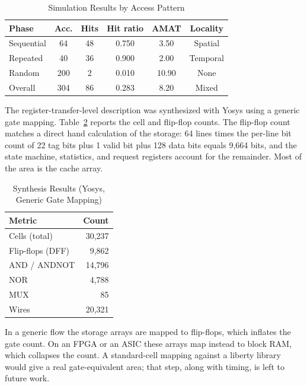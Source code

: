 \documentclass[conference]{IEEEtran}
\begin{document}
\begin{table}[t]
\caption{Simulation Results by Access Pattern}
\label{tab:results}
\centering
\begin{tabular}{@{}lccccc@{}}
\toprule
\textbf{Phase} & \textbf{Acc.} & \textbf{Hits} & \textbf{Hit ratio} & \textbf{AMAT} & \textbf{Locality} \\
\midrule
Sequential & 64  & 48 & 0.750 & 3.50  & Spatial \\
Repeated   & 40  & 36 & 0.900 & 2.00  & Temporal \\
Random     & 200 & 2  & 0.010 & 10.90 & None \\
Overall    & 304 & 86 & 0.283 & 8.20  & Mixed \\
\bottomrule
\end{tabular}
\end{table}

The register-transfer-level description was synthesized with Yosys using a generic gate mapping. Table~\ref{tab:synth} reports the cell and flip-flop counts. The flip-flop count matches a direct hand calculation of the storage: 64 lines times the per-line bit count of 22 tag bits plus 1 valid bit plus 128 data bits equals 9,664 bits, and the state machine, statistics, and request registers account for the remainder. Most of the area is the cache array.

\begin{table}[t]
\caption{Synthesis Results (Yosys, Generic Gate Mapping)}
\label{tab:synth}
\centering
\begin{tabular}{@{}lr@{}}
\toprule
\textbf{Metric} & \textbf{Count} \\
\midrule
Cells (total)    & 30,237 \\
Flip-flops (DFF) & 9,862 \\
AND / ANDNOT     & 14,796 \\
NOR              & 4,788 \\
MUX              & 85 \\
Wires            & 20,321 \\
\bottomrule
\end{tabular}
\end{table}

In a generic flow the storage arrays are mapped to flip-flops, which inflates the gate count. On an FPGA or an ASIC these arrays map instead to block RAM, which collapses the count. A standard-cell mapping against a liberty library would give a real gate-equivalent area; that step, along with timing, is left to future work.
\end{document}
